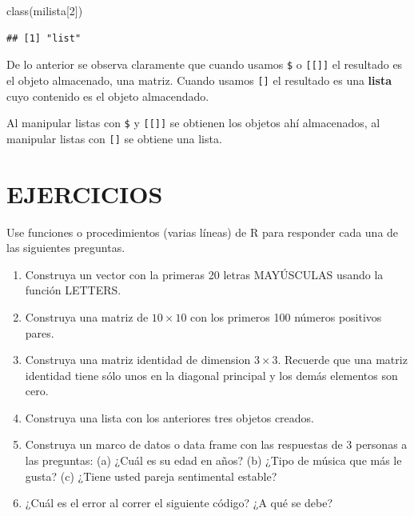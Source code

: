 \documentclass[
]{book}
\makeatletter
\newenvironment{Shaded}{\begin{snugshade}}{\end{snugshade}}
\newcommand{\DecValTok}[1]{\textcolor[rgb]{0.00,0.00,0.81}{#1}}
\newcommand{\FunctionTok}[1]{\textcolor[rgb]{0.00,0.00,0.00}{#1}}
\newcommand{\NormalTok}[1]{#1}
\newenvironment{kframe}{%
\medskip{}
\setlength{\fboxsep}{.8em}
 \def\at@end@of@kframe{}%
 \ifinner\ifhmode%
  \def\at@end@of@kframe{\end{minipage}}%
  \begin{minipage}{\columnwidth}%
 \fi\fi%
 \def\FrameCommand##1{\hskip\@totalleftmargin \hskip-\fboxsep
 \colorbox{shadecolor}{##1}\hskip-\fboxsep
     \hskip-\linewidth \hskip-\@totalleftmargin \hskip\columnwidth}%
 \MakeFramed {\advance\hsize-\width
   \@totalleftmargin\z@ \linewidth\hsize
   \@setminipage}}%
 {\par\unskip\endMakeFramed%
 \at@end@of@kframe}
\renewenvironment{Shaded}{\begin{kframe}}{\end{kframe}}
\newenvironment{rmdblock}[1]
  {
  \begin{itemize}
  \renewcommand{\labelitemi}{
    \raisebox{-.7\height}[0pt][0pt]{
      {\setkeys{Gin}{width=3em,keepaspectratio}\texttt{[image: images/\#1]}}
    }
  }
  \setlength{\fboxsep}{1em}
  \begin{kframe}
  \item
  }
  {
  \end{kframe}
  \end{itemize}
  }
\newenvironment{rmdwarning}
  {\begin{rmdblock}{warning}}
  {\end{rmdblock}}
\makeatother
\begin{document}
\begin{Shaded}
\begin{Highlighting}[]
\FunctionTok{class}\NormalTok{(milista[}\DecValTok{2}\NormalTok{])}
\end{Highlighting}
\end{Shaded}

\begin{verbatim}
## [1] "list"
\end{verbatim}

De lo anterior se observa claramente que cuando usamos \texttt{\$} o \texttt{{[}{[}{]}{]}} el resultado es el objeto almacenado, una matriz. Cuando usamos \texttt{{[}{]}} el resultado es una \textbf{lista} cuyo contenido es el objeto almacendado.

\begin{rmdwarning}
Al manipular listas con \texttt{\$} y \texttt{{[}{[}{]}{]}} se obtienen los objetos ahí almacenados, al manipular listas con \texttt{{[}{]}} se obtiene una lista.
\end{rmdwarning}

\hypertarget{ejercicios}{%
\section*{EJERCICIOS}\label{ejercicios}}

Use funciones o procedimientos (varias líneas) de R para responder cada una de las siguientes preguntas.

\begin{enumerate}
\def\labelenumi{\arabic{enumi}.}
\item
  Construya un vector con la primeras 20 letras MAYÚSCULAS usando la función LETTERS.
\item
  Construya una matriz de \(10 \times 10\) con los primeros 100 números positivos pares.
\item
  Construya una matriz identidad de dimension \(3 \times 3\). Recuerde que una matriz identidad tiene sólo unos en la diagonal principal y los demás elementos son cero.
\item
  Construya una lista con los anteriores tres objetos creados.
\item
  Construya un marco de datos o data frame con las respuestas de 3 personas a las preguntas: (a) ¿Cuál es su edad en años? (b) ¿Tipo de música que más le gusta? (c) ¿Tiene usted pareja sentimental estable?
\item
  ¿Cuál es el error al correr el siguiente código? ¿A qué se debe?
\end{enumerate}
\end{document}
